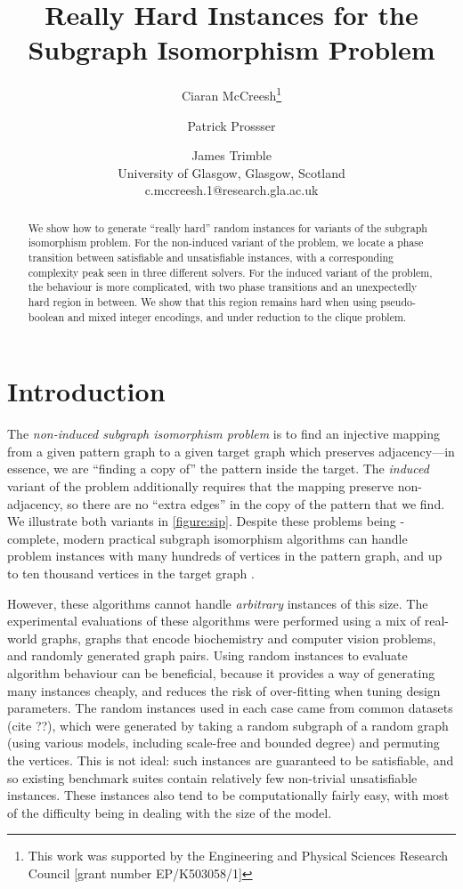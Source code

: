 \documentclass[letterpaper]{article}
\title{Really Hard Instances for the Subgraph Isomorphism Problem}
\author{Ciaran McCreesh\thanks{This work was supported by the Engineering and Physical Sciences
    Research Council [grant number EP/K503058/1]} \and Patrick Prossser \and James Trimble \\
University of Glasgow, Glasgow, Scotland \\
c.mccreesh.1@research.gla.ac.uk}
\begin{document}
\maketitle

\begin{abstract}
    We show how to generate ``really hard'' random instances for variants of the subgraph
    isomorphism problem. For the non-induced variant of the problem, we locate a phase transition
    between satisfiable and unsatisfiable instances, with a corresponding complexity peak seen in
    three different solvers. For the induced variant of the problem, the behaviour is more
    complicated, with two phase transitions and an unexpectedly hard region in between. We show that
    this region remains hard when using pseudo-boolean and mixed integer encodings, and under
    reduction to the clique problem.
\end{abstract}

\section{Introduction}

The \emph{non-induced subgraph isomorphism problem} is to find an injective mapping from a given
pattern graph to a given target graph which preserves adjacency---in essence, we are ``finding a
copy of'' the pattern inside the target. The \emph{induced} variant of the problem additionally
requires that the mapping preserve non-adjacency, so there are no ``extra edges'' in the copy of the
pattern that we find. We illustrate both variants in \cref{figure:sip}.
Despite these problems being \NP-complete, modern practical subgraph isomorphism algorithms can
handle problem instances with many hundreds of vertices in the pattern graph, and up to ten thousand
vertices in the target graph \citep{Cordella:2004,Solnon:2010,Audemard:2014,McCreesh:2015}.

However, these algorithms cannot handle \emph{arbitrary} instances of this size. The experimental
evaluations of these algorithms were performed using a mix of real-world graphs, graphs that encode
biochemistry and computer vision problems, and randomly generated graph pairs. Using random
instances to evaluate algorithm behaviour can be beneficial, because it provides a way of generating
many instances cheaply, and reduces the risk of over-fitting when tuning design parameters. The
random instances used in each case came from common datasets (cite ??), which were generated by
taking a random subgraph of a random graph (using various models, including scale-free and bounded
degree) and permuting the vertices.  This is not ideal: such instances are guaranteed to be
satisfiable, and so existing benchmark suites contain relatively few non-trivial unsatisfiable
instances. These instances also tend to be computationally fairly easy, with most of the difficulty
being in dealing with the size of the model.
\end{document}
